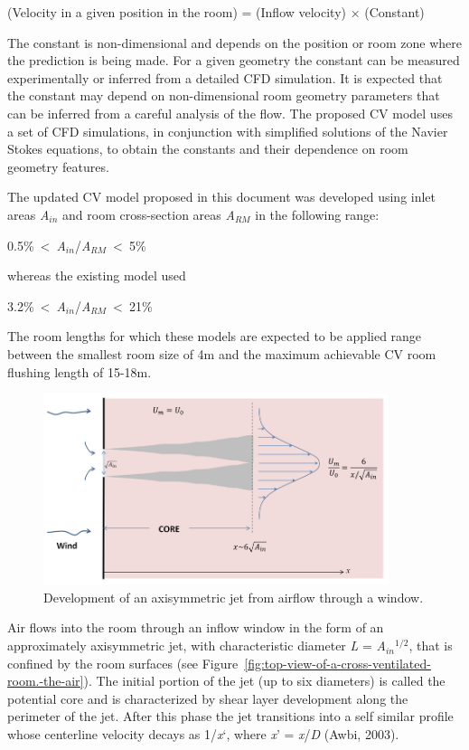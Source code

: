 (Velocity in a given position in the room) = (Inflow velocity) × (Constant)

The constant is non-dimensional and depends on the position or room zone where the prediction is being made. For a given geometry the constant can be measured experimentally or inferred from a detailed CFD simulation. It is expected that the constant may depend on non-dimensional room geometry parameters that can be inferred from a careful analysis of the flow. The proposed CV model uses a set of CFD simulations, in conjunction with simplified solutions of the Navier Stokes equations, to obtain the constants and their dependence on room geometry features.

The updated CV model proposed in this document was developed using inlet areas \emph{A}\(_{in}\) and room cross-section areas \emph{A}\(_{RM}\) in the following range:

0.5\%~\textless{}~\emph{A}\(_{in}\)/\emph{A}\(_{RM}\)~\textless{}~5\%

whereas the existing model used

3.2\%~\textless{}~\emph{A}\(_{in}\)/\emph{A}\(_{RM}\)~\textless{}~21\%

The room lengths for which these models are expected to be applied range between the smallest room size of 4m and the maximum achievable CV room flushing length of 15-18m.

\begin{figure}[hbtp] %
\centering
\includegraphics[width=0.9\textwidth, height=0.9\textheight, keepaspectratio=true]{media/image2622.png}
\caption{Development of an axisymmetric jet from airflow through a window. \protect \label{fig:development-of-an-axisymmetric-jet-from}}
\end{figure}

Air flows into the room through an inflow window in the form of an approximately axisymmetric jet, with characteristic diameter \emph{L} = \emph{A}\(_{in}\)\(^{1/2}\), that is confined by the room surfaces (see Figure~\ref{fig:top-view-of-a-cross-ventilated-room.-the-air}). The initial portion of the jet (up to six diameters) is called the potential core and is characterized by shear layer development along the perimeter of the jet. After this phase the jet transitions into a self similar profile whose centerline velocity decays as 1/\emph{x}`, where \emph{x}' = \emph{x}/\emph{D} (Awbi, 2003).

